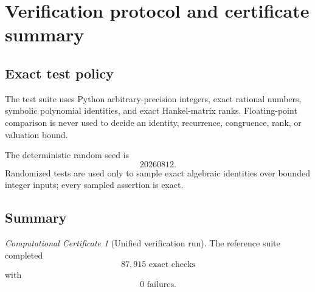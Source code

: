 \documentclass[11pt]{article}
\theoremstyle{definition}\newtheorem{definition}[theorem]{Definition}\newtheorem{example}[theorem]{Example}\newtheorem{construction}[theorem]{Construction}\newtheorem{algorithm}[theorem]{Algorithm}\newtheorem{conjecture}[theorem]{Conjecture}\newtheorem{problem}[theorem]{Problem}
\theoremstyle{remark}\newtheorem{remark}[theorem]{Remark}\newtheorem{boundary}[theorem]{Boundary}\newtheorem{certificate}[theorem]{Computational Certificate}\newtheorem{classical}[theorem]{Classical Input}\newtheorem{principle}[theorem]{Structural Principle}
\begin{document}

\section{Verification protocol and certificate summary}

\subsection{Exact test policy}
The test suite uses Python arbitrary-precision integers, exact rational numbers, symbolic polynomial identities, and exact Hankel-matrix ranks.  Floating-point comparison is never used to decide an identity, recurrence, congruence, rank, or valuation bound.

The deterministic random seed is
\[
 20260812.
\]
Randomized tests are used only to sample exact algebraic identities over bounded integer inputs; every sampled assertion is exact.

\subsection{Summary}
\begin{certificate}[Unified verification run]
The reference suite completed
\[
 \boxed{87{,}915\text{ exact checks}}
\]
with
\[
 \boxed{0\text{ failures}.}
\]
\end{certificate}
\end{document}
